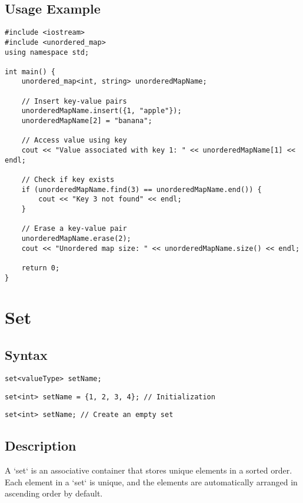 \documentclass{article}
\begin{document}
\subsection{Usage Example}

\begin{lstlisting}
#include <iostream>
#include <unordered_map>
using namespace std;

int main() {
    unordered_map<int, string> unorderedMapName;
    
    // Insert key-value pairs
    unorderedMapName.insert({1, "apple"});
    unorderedMapName[2] = "banana";
    
    // Access value using key
    cout << "Value associated with key 1: " << unorderedMapName[1] << endl;
    
    // Check if key exists
    if (unorderedMapName.find(3) == unorderedMapName.end()) {
        cout << "Key 3 not found" << endl;
    }
    
    // Erase a key-value pair
    unorderedMapName.erase(2);
    cout << "Unordered map size: " << unorderedMapName.size() << endl;
    
    return 0;
}
\end{lstlisting}

\newpage
\section{Set}

\subsection{Syntax}

\begin{lstlisting}
set<valueType> setName;
\end{lstlisting}

\begin{lstlisting}
set<int> setName = {1, 2, 3, 4}; // Initialization
\end{lstlisting}

\begin{lstlisting}
set<int> setName; // Create an empty set
\end{lstlisting}

\subsection{Description}

A `set` is an associative container that stores unique elements in a sorted order. Each element in a `set` is unique, and the elements are automatically arranged in ascending order by default.
\end{document}
